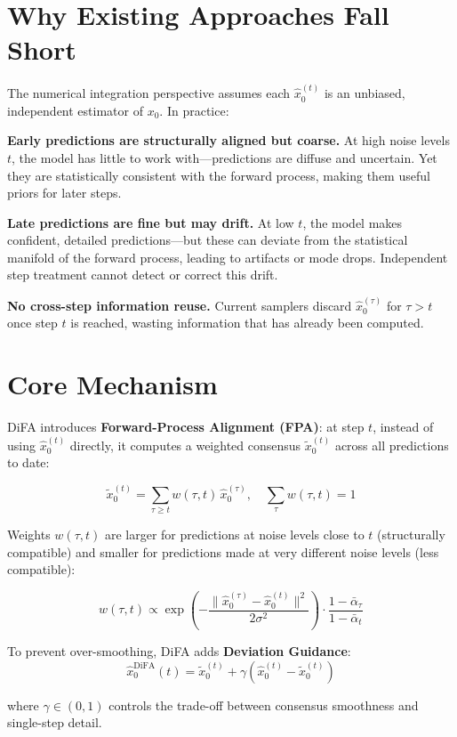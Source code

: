 \documentclass[10pt,twocolumn]{article}
\begin{document}
\section{Why Existing Approaches Fall Short}

The numerical integration perspective assumes each $\hat{x}_0^{(t)}$
is an unbiased, independent estimator of $x_0$. In practice:

\textbf{Early predictions are structurally aligned but coarse.}
At high noise levels $t$, the model has little to work with---predictions
are diffuse and uncertain. Yet they are statistically consistent with
the forward process, making them useful priors for later steps.

\textbf{Late predictions are fine but may drift.} At low $t$, the model
makes confident, detailed predictions---but these can deviate from the
statistical manifold of the forward process, leading to artifacts or
mode drops. Independent step treatment cannot detect or correct this drift.

\textbf{No cross-step information reuse.} Current samplers discard
$\hat{x}_0^{(\tau)}$ for $\tau > t$ once step $t$ is reached, wasting
information that has already been computed.

\section{Core Mechanism}

DiFA introduces \textbf{Forward-Process Alignment (FPA)}: at step $t$,
instead of using $\hat{x}_0^{(t)}$ directly, it computes a weighted
consensus $\tilde{x}_0^{(t)}$ across all predictions to date:

\[
  \tilde{x}_0^{(t)} = \sum_{\tau \geq t} w(\tau, t)\,\hat{x}_0^{(\tau)},
  \quad \sum_\tau w(\tau, t) = 1
\]

Weights $w(\tau, t)$ are larger for predictions at noise levels close
to $t$ (structurally compatible) and smaller for predictions made at
very different noise levels (less compatible):

\[
  w(\tau, t) \propto
    \exp\!\left(-\frac{\|\hat{x}_0^{(\tau)}-\hat{x}_0^{(t)}\|^2}{2\sigma^2}\right)
    \cdot \frac{1-\bar\alpha_\tau}{1-\bar\alpha_t}
\]

To prevent over-smoothing, DiFA adds \textbf{Deviation Guidance}:
\[
  \hat{x}_0^\text{DiFA}(t) = \tilde{x}_0^{(t)}
    + \gamma\!\left(\hat{x}_0^{(t)} - \tilde{x}_0^{(t)}\right)
\]

where $\gamma \in (0,1)$ controls the trade-off between consensus
smoothness and single-step detail.
\end{document}
